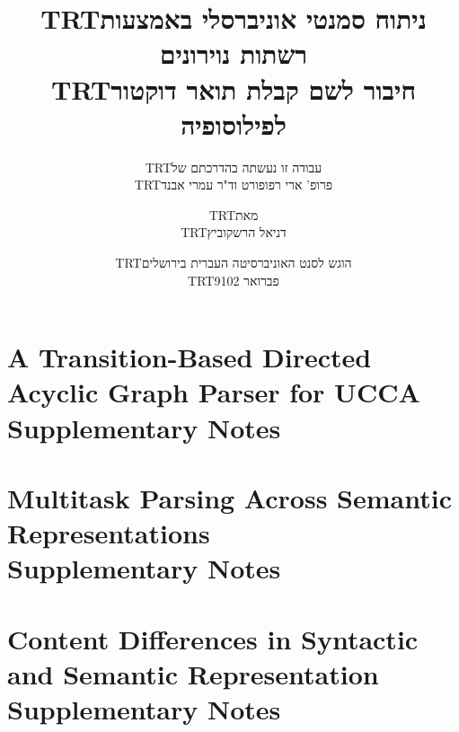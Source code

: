 \documentclass[12pt,a4paper]{report}
\newcommand{\heb}[1]{\bgroup\textdir TRT\hebfont #1\egroup}
\begin{document}



\appendix

\chapter{A Transition-Based Directed Acyclic Graph Parser for UCCA \\ Supplementary Notes}



\chapter{Multitask Parsing Across Semantic Representations \\ Supplementary Notes}



\chapter{Content Differences in Syntactic and Semantic Representation \\ Supplementary Notes}



\pagebreak

\section*{\flushright{\heb{תקציר}}}

\pagebreak

\clearpage

\title{}
\author{
\heb{עבודה זו נעשתה בהדרכתם של} \\
\heb{פרופ' ארי רפופורט וד"ר עמרי אבנד}}
\date{}

\maketitle
\clearpage

\title{
\textbf{\heb{ניתוח סמנטי אוניברסלי באמצעות רשתות נוירונים}} \\
\vspace{2cm}
{\large\heb{חיבור לשם קבלת תואר דוקטור לפילוסופיה}}
}
\author{
\heb{מאת}\\
\heb{דניאל הרשקוביץ}
\vspace{2cm}
}
\date{
\heb{הוגש לסנט האוניברסיטה העברית בירושלים} \\
\heb{פברואר 9102}
}

\maketitle
\maketitle
\end{document}
